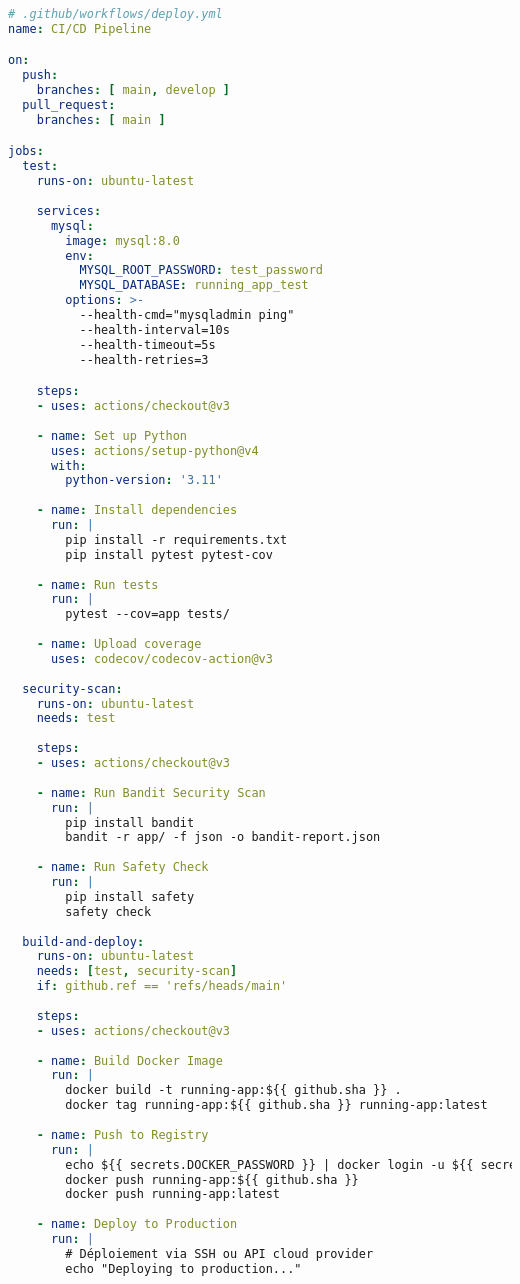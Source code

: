 \begin{lstlisting}[language=yaml]
# .github/workflows/deploy.yml
name: CI/CD Pipeline

on:
  push:
    branches: [ main, develop ]
  pull_request:
    branches: [ main ]

jobs:
  test:
    runs-on: ubuntu-latest
    
    services:
      mysql:
        image: mysql:8.0
        env:
          MYSQL_ROOT_PASSWORD: test_password
          MYSQL_DATABASE: running_app_test
        options: >-
          --health-cmd="mysqladmin ping"
          --health-interval=10s
          --health-timeout=5s
          --health-retries=3

    steps:
    - uses: actions/checkout@v3
    
    - name: Set up Python
      uses: actions/setup-python@v4
      with:
        python-version: '3.11'
    
    - name: Install dependencies
      run: |
        pip install -r requirements.txt
        pip install pytest pytest-cov
    
    - name: Run tests
      run: |
        pytest --cov=app tests/
        
    - name: Upload coverage
      uses: codecov/codecov-action@v3
      
  security-scan:
    runs-on: ubuntu-latest
    needs: test
    
    steps:
    - uses: actions/checkout@v3
    
    - name: Run Bandit Security Scan
      run: |
        pip install bandit
        bandit -r app/ -f json -o bandit-report.json
    
    - name: Run Safety Check
      run: |
        pip install safety
        safety check
        
  build-and-deploy:
    runs-on: ubuntu-latest
    needs: [test, security-scan]
    if: github.ref == 'refs/heads/main'
    
    steps:
    - uses: actions/checkout@v3
    
    - name: Build Docker Image
      run: |
        docker build -t running-app:${{ github.sha }} .
        docker tag running-app:${{ github.sha }} running-app:latest
    
    - name: Push to Registry
      run: |
        echo ${{ secrets.DOCKER_PASSWORD }} | docker login -u ${{ secrets.DOCKER_USERNAME }} --password-stdin
        docker push running-app:${{ github.sha }}
        docker push running-app:latest
    
    - name: Deploy to Production
      run: |
        # Déploiement via SSH ou API cloud provider
        echo "Deploying to production..."
\end{lstlisting}

